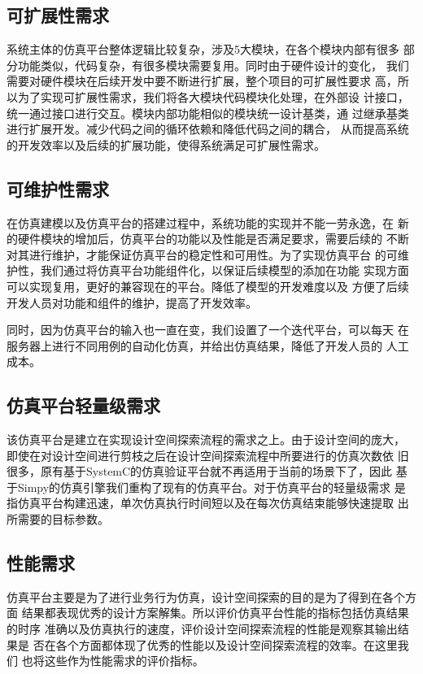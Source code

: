 \subsection{可扩展性需求}
系统主体的仿真平台整体逻辑比较复杂，涉及5大模块，在各个模块内部有很多
部分功能类似，代码复杂，有很多模块需要复用。同时由于硬件设计的变化，
我们需要对硬件模块在后续开发中要不断进行扩展，整个项目的可扩展性要求
高，所以为了实现可扩展性需求，我们将各大模块代码模块化处理，在外部设
计接口，统一通过接口进行交互。模块内部功能相似的模块统一设计基类，通
过继承基类进行扩展开发。减少代码之间的循环依赖和降低代码之间的耦合，
从而提高系统的开发效率以及后续的扩展功能，使得系统满足可扩展性需求。

\subsection{可维护性需求}
在仿真建模以及仿真平台的搭建过程中，系统功能的实现并不能一劳永逸，在
新的硬件模块的增加后，仿真平台的功能以及性能是否满足要求，需要后续的
不断对其进行维护，才能保证仿真平台的稳定性和可用性。为了实现仿真平台
的可维护性，我们通过将仿真平台功能组件化，以保证后续模型的添加在功能
实现方面可以实现复用，更好的兼容现在的平台。降低了模型的开发难度以及
方便了后续开发人员对功能和组件的维护，提高了开发效率。

同时，因为仿真平台的输入也一直在变，我们设置了一个迭代平台，可以每天
在服务器上进行不同用例的自动化仿真，并给出仿真结果，降低了开发人员的
人工成本。

\subsection{仿真平台轻量级需求}
该仿真平台是建立在实现设计空间探索流程的需求之上。由于设计空间的庞大，
即使在对设计空间进行剪枝之后在设计空间探索流程中所要进行的仿真次数依
旧很多，原有基于SystemC的仿真验证平台就不再适用于当前的场景下了，因此
基于Simpy的仿真引擎我们重构了现有的仿真平台。对于仿真平台的轻量级需求
是指仿真平台构建迅速，单次仿真执行时间短以及在每次仿真结束能够快速提取
出所需要的目标参数。

\subsection{性能需求}
仿真平台主要是为了进行业务行为仿真，设计空间探索的目的是为了得到在各个方面
结果都表现优秀的设计方案解集。所以评价仿真平台性能的指标包括仿真结果的时序
准确以及仿真执行的速度，评价设计空间探索流程的性能是观察其输出结果是
否在各个方面都体现了优秀的性能以及设计空间探索流程的效率。在这里我们
也将这些作为性能需求的评价指标。

